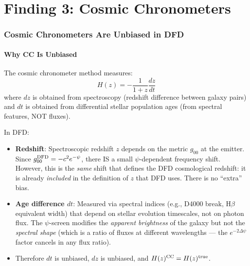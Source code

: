 \documentclass[11pt,a4paper]{article}
\newcounter{findingctr}
\newenvironment{finding}[1][]{%
  \refstepcounter{findingctr}%
  \begin{tcolorbox}[colback=blue!3!white, colframe=blue!50!black,
    title=\textbf{Finding \thefindingctr: #1}]
}{%
  \end{tcolorbox}%
}
\newcommand{\Dpsi}{\Delta\psi}
\begin{document}
\part{Finding 3: Cosmic Chronometers}
\label{sec:CC}

\section{Cosmic Chronometers Are Unbiased in DFD}

\begin{finding}[\textbf{CC UNBIASED}: $H_0^{\rm CC} = H_0^{\rm Planck}$
  Is a Firm DFD Prediction]
\label{find:CC}

\subsection*{Why CC Is Unbiased}

The cosmic chronometer method measures:
\begin{equation}
H(z) = -\frac{1}{1+z}\frac{dz}{dt}
\end{equation}
where $dz$ is obtained from spectroscopy (redshift difference
between galaxy pairs) and $dt$ is obtained from differential
stellar population ages (from spectral features, NOT fluxes).

In DFD:
\begin{itemize}[nosep]
\item \textbf{Redshift}: Spectroscopic redshift $z$ depends on
  the metric $g_{00}$ at the emitter. Since $g_{00}^{\rm DFD}
  = -c^2 e^{-\psi}$, there IS a small $\psi$-dependent frequency
  shift. However, this is the \emph{same} shift that defines
  the DFD cosmological redshift: it is already \emph{included}
  in the definition of $z$ that DFD uses. There is no
  ``extra'' bias.
\item \textbf{Age difference $dt$}: Measured via spectral indices
  (e.g., D4000 break, H$\beta$ equivalent width) that depend
  on stellar evolution timescales, not on photon flux.
  The $\psi$-screen modifies the \emph{apparent brightness} of
  the galaxy but not the \emph{spectral shape} (which is a
  ratio of fluxes at different wavelengths --- the $e^{-2\Dpsi}$
  factor cancels in any flux ratio).
\item Therefore $dt$ is unbiased, $dz$ is unbiased, and
  $H(z)^{\rm CC} = H(z)^{\rm true}$.
\end{itemize}


\end{finding}
\end{document}
